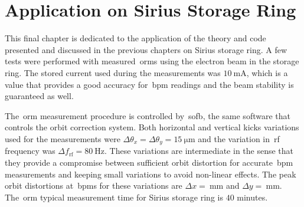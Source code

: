 \chapter{Application on Sirius Storage Ring}

This final chapter is dedicated to the application of the theory and code presented and discussed in the previous chapters on Sirius storage ring. A few tests were performed with measured~\glspl{orm} using the electron beam in the storage ring. The stored current used during the measurements was $\SI{10}{\milli\ampere}$, which is a value that provides a good accuracy for~\gls{bpm} readings and the beam stability is guaranteed as well.

The~\gls{orm} measurement procedure is controlled by~\gls{sofb}, the same software that controls the orbit correction system. Both horizontal and vertical kicks variations used for the measurements were $\Delta \theta_x = \Delta \theta_y = \SI{15}{\micro\meter}$ and the variation in~\gls{rf} frequency was $\Delta f_{\mathrm{rf}} = \SI{80}{\hertz}$. These variations are intermediate in the sense that they provide a compromise between sufficient orbit distortion for accurate~\gls{bpm} measurements and keeping small variations to avoid non-linear effects. The peak orbit distortions at~\glspl{bpm} for these variations are $\Delta x = \SI{}{\milli\meter}$ and $\Delta y = \SI{}{\milli\meter}$. The~\gls{orm} typical measurement time for Sirius storage ring is $40$ minutes.




